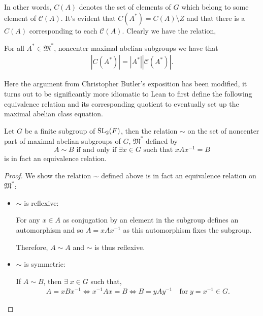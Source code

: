 \begin{footnotesize}
In other words, $C(A)$ denotes the set of elements of $G$ which belong to some element of $\mathcal{C}(A)$. It's evident that $C(A^*) = C(A) \setminus Z$ and 
that there is a $C(A)$ corresponding to each $\mathcal{C}(A)$. Clearly we have the relation,
\begin{lemma}
\label{card_noncenter_C_eq_noncenter_MaximalAbelianSubgroup_mul_noncenter_ConjClassOfSet}
\leanok
For all $A^* \in \mathfrak{M}^*$, noncenter maximal abelian subgroups we have that
\begin{align} 
  |C(A^*)| = |A^*||\mathcal{C}(A^*)|.
\end{align}
\end{lemma}


Here the argument from Christopher Butler's exposition has been modified, it turns out to be significantly more
idiomatic to Lean to first define the following equivalence relation and its corresponding quotient to eventually set up
the maximal abelian class equation.

\begin{lemma}
\label{lift_noncenter_MaximalAbelianSubgroupsOf}
\leanok
 Let $G$ be a finite subgroup of $\operatorname{SL}_2(F)$, then the relation $\sim$ on the set of noncenter part of maximal abelian subgroups of $G$, $\mathfrak{M}^*$ defined by
 \[
 A \sim B \text{ if and only if } \exists x \in G \text{ such that } x A x^{-1} = B
 \]
 is in fact an equivalence relation.
\end{lemma}
\begin{proof}
  \leanok
 We show the relation $\sim$ defined above is in fact an equivalence relation on  $\mathfrak{M}^*$:
\begin{itemize}
\item $\sim$ is reflexive:

For any $x \in A$ as conjugation by an element in the subgroup defines an automorphism and so $A = x A x^{-1}$ as this automorphism fixes the subgroup.

Therefore, $A \sim A$ and $\sim$ is thus reflexive.

\item $\sim$ is symmetric:

If $A \sim B$, then $\exists \; x \in G$ such that,
\begin{align*}
  A = xBx^{-1} \iff x^{-1}Ax = B \iff B = yAy^{-1} \quad \text{for} \; y = x^{-1} \in G.
\end{align*}


\end{itemize}
\end{proof}
\end{footnotesize}
